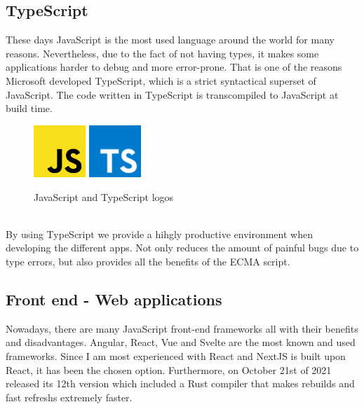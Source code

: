\documentclass[a4paper, 12pt, oneside]{book}
\begin{document}
\subsection{TypeScript}
These days JavaScript is the most used language around the world for many reasons. Nevertheless, due to the fact of not having types, it makes some applications harder to debug and more error-prone. That is one of the reasons Microsoft developed TypeScript, which is a strict syntactical superset of JavaScript. The code written in TypeScript is transcompiled to JavaScript at build time. 
\\
\begin{figure}[h!]
	\centering
	\includegraphics[width=0.175\textwidth]{assets/js-logo.png}
	\includegraphics[width=0.175\textwidth]{assets/ts-logo.png}
	\caption{JavaScript and TypeScript logos}
\end{figure}
\\
By using TypeScript we provide a hihgly productive environment when developing the different apps. Not only reduces the amount of painful bugs due to type errors, but also provides all the benefits of the ECMA script.
\subsection{Front end - Web applications}
Nowadays, there are many JavaScript front-end frameworks all with their benefits and disadvantages. Angular, React, Vue and Svelte are the most known and used frameworks. Since I am most experienced with React and NextJS is built upon React, it has been the chosen option. Furthermore, on October 21st of 2021 released its 12th version which included a Rust compiler that makes rebuilds and fast refreshs extremely faster. 
\end{document}
